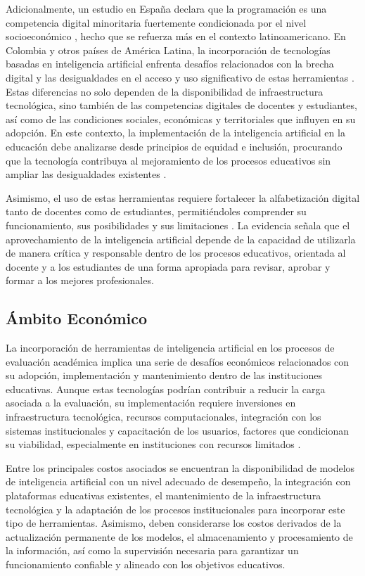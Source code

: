 \documentclass[letterpaper, 10 pt, conference]{ieeeconf}
\begin{document}
Adicionalmente, un estudio en España declara que la programación es una competencia digital minoritaria fuertemente condicionada por el nivel socioeconómico \cite{19}, hecho que se refuerza más en el contexto latinoamericano. En Colombia y otros países de América Latina, la incorporación de tecnologías basadas en inteligencia artificial enfrenta desafíos relacionados con la brecha digital y las desigualdades en el acceso y uso significativo de estas herramientas \cite{17}. Estas diferencias no solo dependen de la disponibilidad de infraestructura tecnológica, sino también de las competencias digitales de docentes y estudiantes, así como de las condiciones sociales, económicas y territoriales que influyen en su adopción. En este contexto, la implementación de la inteligencia artificial en la educación debe analizarse desde principios de equidad e inclusión, procurando que la tecnología contribuya al mejoramiento de los procesos educativos sin ampliar las desigualdades existentes \cite{16}.

Asimismo, el uso de estas herramientas requiere fortalecer la alfabetización digital tanto de docentes como de estudiantes, permitiéndoles comprender su funcionamiento, sus posibilidades y sus limitaciones \cite{17}. La evidencia señala que el aprovechamiento de la inteligencia artificial depende de la capacidad de utilizarla de manera crítica y responsable dentro de los procesos educativos, orientada al docente y a los estudiantes de una forma apropiada para revisar, aprobar y formar a los mejores profesionales. 


\subsection{Ámbito Económico}  

La incorporación de herramientas de inteligencia artificial en los procesos de evaluación académica implica una serie de desafíos económicos relacionados con su adopción, implementación y mantenimiento dentro de las instituciones educativas. Aunque estas tecnologías podrían contribuir a reducir la carga asociada a la evaluación, su implementación requiere inversiones en infraestructura tecnológica, recursos computacionales, integración con los sistemas institucionales y capacitación de los usuarios, factores que condicionan su viabilidad, especialmente en instituciones con recursos limitados \cite{18}. 

Entre los principales costos asociados se encuentran la disponibilidad de modelos de inteligencia artificial con un nivel adecuado de desempeño, la integración con plataformas educativas existentes, el mantenimiento de la infraestructura tecnológica y la adaptación de los procesos institucionales para incorporar este tipo de herramientas. Asimismo, deben considerarse los costos derivados de la actualización permanente de los modelos, el almacenamiento y procesamiento de la información, así como la supervisión necesaria para garantizar un funcionamiento confiable y alineado con los objetivos educativos. 
\end{document}
